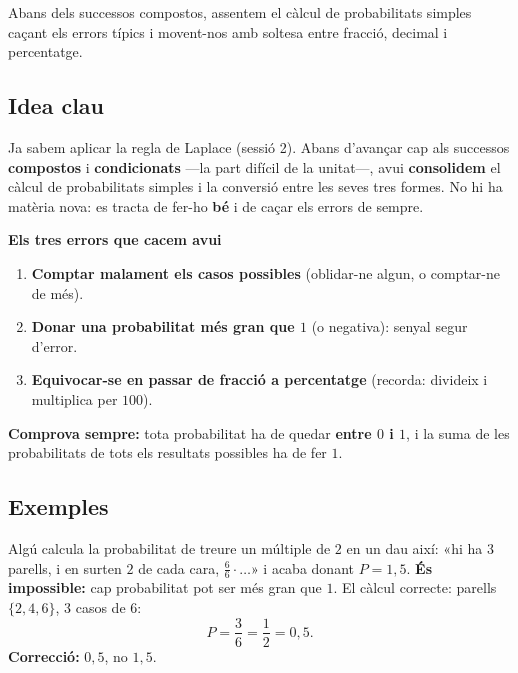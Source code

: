 %
{Abans dels successos compostos, assentem el càlcul de probabilitats simples caçant els errors típics i movent-nos amb soltesa entre fracció, decimal i percentatge.}

\subsection{Idea clau}

Ja sabem aplicar la regla de Laplace (sessió 2). Abans d'avançar cap als successos
\textbf{compostos} i \textbf{condicionats} —la part difícil de la unitat—, avui
\textbf{consolidem} el càlcul de probabilitats simples i la conversió entre les seves
tres formes. No hi ha matèria nova: es tracta de fer-ho \textbf{bé} i de caçar els
errors de sempre.

\begin{idea}
\textbf{Els tres errors que cacem avui}
\begin{enumerate}[leftmargin=1.6em, itemsep=2pt]
  \item \textbf{Comptar malament els casos possibles} (oblidar-ne algun, o comptar-ne de
        més).
  \item \textbf{Donar una probabilitat més gran que $1$} (o negativa): senyal segur
        d'error.
  \item \textbf{Equivocar-se en passar de fracció a percentatge} (recorda: divideix i
        multiplica per $100$).
\end{enumerate}
\textbf{Comprova sempre:} tota probabilitat ha de quedar \textbf{entre $0$ i $1$}, i la
suma de les probabilitats de tots els resultats possibles ha de fer \textbf{$1$}.
\end{idea}

\subsection{Exemples}

\begin{exemple}
Algú calcula la probabilitat de treure un múltiple de $2$ en un dau així: «hi ha $3$
parells, i en surten $2$ de cada cara, $\frac{6}{6}\cdot\dots$» i acaba donant
$P=1,5$. \textbf{És impossible:} cap probabilitat pot ser més gran que $1$. El càlcul
correcte: parells $\{2,4,6\}$, $3$ casos de $6$:
\[
P=\frac{3}{6}=\frac{1}{2}=0,5.
\]
\textbf{Correcció:} $0,5$, no $1,5$.
\end{exemple}

